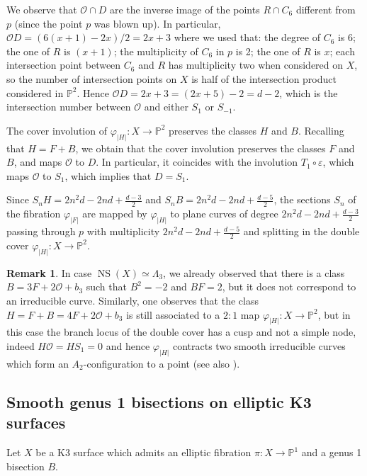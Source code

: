 \documentclass{amsart}
\theoremstyle{definition}
\newtheorem{remark}[theorem]{Remark}
\numberwithin{equation}{section}
\newcommand{\ra}{\rightarrow}
\DeclareMathOperator{\NS}{NS}
\begin{document}
We observe that $\mathcal{O}\cap D$ are the inverse image of the points $R\cap C_6$ different from $p$ (since the point $p$ was blown up). In particular, $\mathcal{O}D=(6(x+1)-2x)/2=2x+3$ where we used that: the degree of $C_6$ is 6; the one of $R$ is $(x+1)$; the multiplicity of $C_6$ in $p$ is 2; the one of $R$ is $x$; each intersection point between $C_6$ and $R$ has multiplicity two when considered on $X$, so the number of intersection points on $X$ is half of the intersection product considered in $\mathbb{P}^2$.
Hence $\mathcal{O}D=2x+3=(2x+5)-2=d-2$, which is the intersection number between $\mathcal{O}$ and either $S_1$ or $S_{-1}$. 

The cover involution of $\varphi_{|H|}:X\ra \mathbb{P}^2$ preserves the classes $H$ and $B$. Recalling that $H=F+B$, we obtain that the cover involution preserves the classes $F$ and $B$, and maps $\mathcal{O}$ to $D$. In particular, it coincides with the involution $ T_1\circ\varepsilon$, which maps $\mathcal{O}$ to $S_{1}$, which implies that $D=S_{1}$.
\endproof

Since $S_{n}H=2n^2d- 2nd+\frac{d-3}{2}$ and $S_{n}B=2n^2d- 2nd+\frac{d-5}{2}$, the sections $S_{n}$ of the fibration $\varphi_{|F|}$ are mapped by $\varphi_{|H|}$ to plane curves of degree $2n^2d- 2nd+\frac{d-3}{2}$ passing through $p$ with multiplicity $2n^2d- 2nd+\frac{d-5}{2}$ and splitting in the double cover $\varphi_{|H|}:X\ra \mathbb{P}^2$. 
\begin{remark}\label{rem: d=3 double cover of the plane} In case $\NS(X)\simeq \Lambda_3$, we already observed that there is a class $B=3F+2\mathcal{O}+b_3$ such that $B^2=-2$ and $BF=2$, but it does not correspond to an irreducible curve. Similarly, one observes that the class $H=F+B=4F+2\mathcal{O}+b_3$ is still associated to a $2:1$ map $\varphi_{|H|}:X\ra\mathbb{P}^2$, but in this case the branch locus of the double cover has a cusp and not a simple node, indeed $H\mathcal{O}=HS_1=0$ and hence $\varphi_{|H|}$ contracts two smooth irreducible curves which form an $A_2$-configuration to a point (see also \cite[Section 6.3]{FM}).\end{remark}
\subsection{Smooth genus 1 bisections on elliptic K3 surfaces}

Let $X$ be a K3 surface which admits an elliptic fibration $\pi:X\ra \mathbb{P}^1$ and a genus 1 bisection $B$.  
\end{document}

